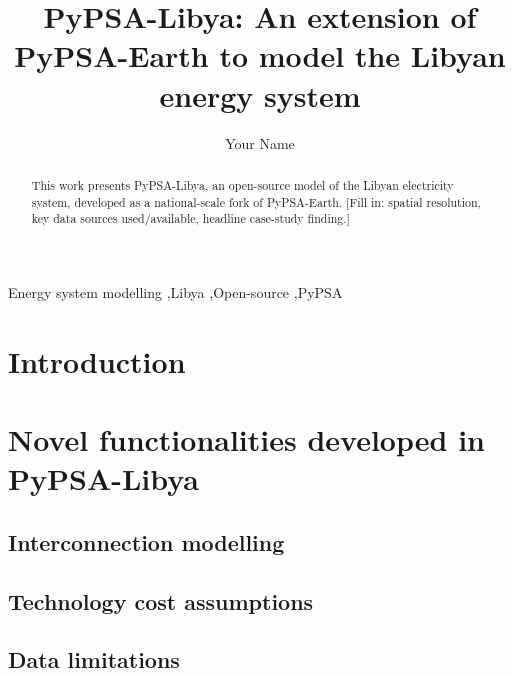 \documentclass[preprint,12pt]{elsarticle}
\begin{document}
\begin{frontmatter}

\title{PyPSA-Libya: An extension of PyPSA-Earth to model the Libyan energy system}

\author[a]{Your Name}

\begin{abstract}
This work presents PyPSA-Libya, an open-source model of the Libyan electricity
system, developed as a national-scale fork of PyPSA-Earth. [Fill in: spatial
resolution, key data sources used/available, headline case-study finding.]
\end{abstract}

\begin{keyword}
Energy system modelling \sep Libya \sep Open-source \sep PyPSA
\end{keyword}

\end{frontmatter}

\section{Introduction}

\section{Novel functionalities developed in PyPSA-Libya}

\subsection{Interconnection modelling}

\subsection{Technology cost assumptions}

\subsection{Data limitations}
\end{document}
